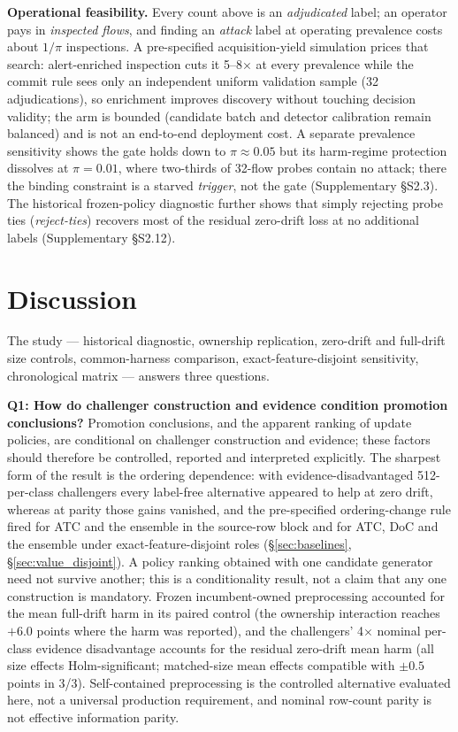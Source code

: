 \documentclass[a4paper,fleqn]{cas-sc}
\begin{document}


\textbf{Operational feasibility.} Every count above is an \emph{adjudicated} label; an operator pays in \emph{inspected flows}, and finding an \emph{attack} label at operating prevalence costs about $1/\pi$ inspections. A pre-specified acquisition-yield simulation prices that search: alert-enriched inspection cuts it 5--8$\times$ at every prevalence while the commit rule sees only an independent uniform validation sample (32 adjudications), so enrichment improves discovery without touching decision validity; the arm is bounded (candidate batch and detector calibration remain balanced) and is not an end-to-end deployment cost. A separate prevalence sensitivity shows the gate holds down to $\pi \approx 0.05$ but its harm-regime protection dissolves at $\pi = 0.01$, where two-thirds of 32-flow probes contain no attack; there the binding constraint is a starved \emph{trigger}, not the gate (Supplementary \S S2.3). The historical frozen-policy diagnostic further shows that simply rejecting probe ties (\emph{reject-ties}) recovers most of the residual zero-drift loss at no additional labels (Supplementary \S S2.12).

\section{Discussion}


The study --- historical diagnostic, ownership replication, zero-drift and full-drift size controls, common-harness comparison, exact-feature-disjoint sensitivity, chronological matrix --- answers three questions.

\textbf{Q1: How do challenger construction and evidence condition promotion conclusions?} Promotion conclusions, and the apparent ranking of update policies, are conditional on challenger construction and evidence; these factors should therefore be controlled, reported and interpreted explicitly. The sharpest form of the result is the ordering dependence: with evidence-disadvantaged 512-per-class challengers every label-free alternative appeared to help at zero drift, whereas at parity those gains vanished, and the pre-specified ordering-change rule fired for ATC and the ensemble in the source-row block and for ATC, DoC and the ensemble under exact-feature-disjoint roles (\S\ref{sec:baselines}, \S\ref{sec:value_disjoint}). A policy ranking obtained with one candidate generator need not survive another; this is a conditionality result, not a claim that any one construction is mandatory. Frozen incumbent-owned preprocessing accounted for the mean full-drift harm in its paired control (the ownership interaction reaches $+6.0$ points where the harm was reported), and the challengers' 4$\times$ nominal per-class evidence disadvantage accounts for the residual zero-drift mean harm (all size effects Holm-significant; matched-size mean effects compatible with $\pm0.5$ points in 3/3). Self-contained preprocessing is the controlled alternative evaluated here, not a universal production requirement, and nominal row-count parity is not effective information parity.
\end{document}
